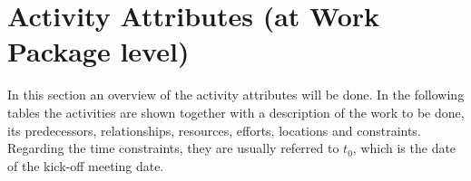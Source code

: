 \chapter{Activity Attributes (at Work Package level)}
In this section an overview of the activity attributes will be done. In the following tables the activities are shown together with a description of the work to be done, its predecessors, relationships, resources, efforts, locations and constraints. Regarding the time constraints, they are usually referred to $t_{0}$, which is the date of the kick-off meeting date.







